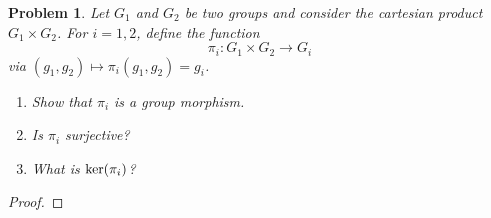 \documentclass[reqno]{amsart}
\theoremstyle{plain}
\newtheorem{problem}{Problem}
\theoremstyle{definition}
\begin{document}
\begin{problem}
Let $G_{1}$ and $G_{2}$ be two groups and consider the cartesian product $G_{1} \times G_{2}$.  For $i=1,2$, define the function
$$\pi_{i}: G_{1} \times G_{2} \longrightarrow G_{i} $$
via $(g_{1},g_{2}) \mapsto \pi_{i}(g_{1},g_{2}) = g_{i}$.
\begin{enumerate}
\item Show that $\pi_{i}$ is a group morphism.
\item Is $\pi_{i}$ surjective?
\item What is ${\rm ker}(\pi_{i})$?
\end{enumerate}
\end{problem}
\begin{proof}

\end{proof}
\end{document}
